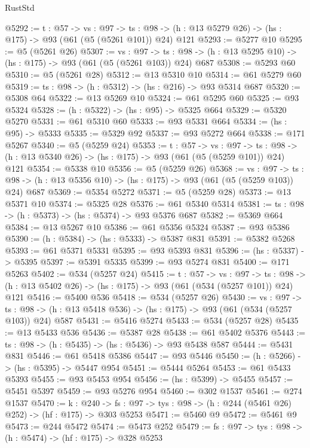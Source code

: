 \begin{lexlean}{RustStd}
\begin{coremodule}
@5292 := {t : @57} ->
  {vs : @97} ->
  {ts : @98} -> (h : @13 @5279 @26) -> (hs : @175) -> @93 (@61 (@5 (@5261 @101)) @24) @121
@5293 := @5277 @10
@5295 := @5 (@5261 @26)
@5307 := {vs : @97} ->
  {ts : @98} -> (h : @13 @5295 @10) -> (hs : @175) -> @93 (@61 (@5 (@5261 @103)) @24) @687
@5308 := @5293 @60
@5310 := @5 (@5261 @28)
@5312 := @13 @5310 @10
@5314 := @61 @5279 @60
@5319 := {ts : @98} -> (h : @5312) -> (hs : @216) -> @93 @5314 @687
@5320 := @5308 @64
@5322 := @13 @5269 @10
@5324 := @61 @5295 @60
@5325 := @93 @5324
@5328 := (h : @5322) -> (hs : @95) -> @5325 @664
@5329 := @5320 @5270
@5331 := @61 @5310 @60
@5333 := @93 @5331 @664
@5334 := (hs : @95) -> @5333
@5335 := @5329 @92
@5337 := @93 @5272 @664
@5338 := @171 @5267
@5340 := @5 (@5259 @24)
@5353 := {t : @57} ->
  {vs : @97} ->
  {ts : @98} -> (h : @13 @5340 @26) -> (hs : @175) -> @93 (@61 (@5 (@5259 @101)) @24) @121
@5354 := @5338 @10
@5356 := @5 (@5259 @26)
@5368 := {vs : @97} ->
  {ts : @98} -> (h : @13 @5356 @10) -> (hs : @175) -> @93 (@61 (@5 (@5259 @103)) @24) @687
@5369 := @5354 @5272
@5371 := @5 (@5259 @28)
@5373 := @13 @5371 @10
@5374 := @5325 @28
@5376 := @61 @5340 @5314
@5381 := {ts : @98} -> (h : @5373) -> (hs : @5374) -> @93 @5376 @687
@5382 := @5369 @664
@5384 := @13 @5267 @10
@5386 := @61 @5356 @5324
@5387 := @93 @5386
@5390 := (h : @5384) -> (hs : @5333) -> @5387 @831
@5391 := @5382 @5268
@5393 := @61 @5371 @5331
@5395 := @93 @5393 @831
@5396 := (hs : @5337) -> @5395
@5397 := @5391 @5335
@5399 := @93 @5274 @831
@5400 := @171 @5263
@5402 := @534 (@5257 @24)
@5415 := {t : @57} ->
  {vs : @97} ->
  {ts : @98} -> (h : @13 @5402 @26) -> (hs : @175) -> @93 (@61 (@534 (@5257 @101)) @24) @121
@5416 := @5400 @536
@5418 := @534 (@5257 @26)
@5430 := {vs : @97} ->
  {ts : @98} -> (h : @13 @5418 @536) -> (hs : @175) -> @93 (@61 (@534 (@5257 @103)) @24) @587
@5431 := @5416 @5274
@5433 := @534 (@5257 @28)
@5435 := @13 @5433 @536
@5436 := @5387 @28
@5438 := @61 @5402 @5376
@5443 := {ts : @98} -> (h : @5435) -> (hs : @5436) -> @93 @5438 @587
@5444 := @5431 @831
@5446 := @61 @5418 @5386
@5447 := @93 @5446
@5450 := (h : @5266) -> (hs : @5395) -> @5447 @954
@5451 := @5444 @5264
@5453 := @61 @5433 @5393
@5455 := @93 @5453 @954
@5456 := (hs : @5399) -> @5455
@5457 := @5451 @5397
@5459 := @93 @5276 @954
@5460 := @302 @1537
@5461 := @274 @1537
@5470 := {k : @240} ->
  {fs : @97} -> {tys : @98} -> (h : @244 (@5461 @26) @252) -> (hf : @175) -> @303 @5253
@5471 := @5460 @9
@5472 := @5461 @9
@5473 := @244 @5472
@5474 := @5473 @252
@5479 := {fs : @97} -> {tys : @98} -> (h : @5474) -> (hf : @175) -> @328 @5253

\end{coremodule}
\end{lexlean}
